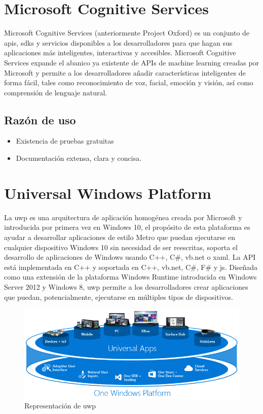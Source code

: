 \section{Microsoft Cognitive Services}

Microsoft Cognitive Services\cite{Oxford} (anteriormente Project Oxford) es un conjunto de \acrshort{api}s, \acrshort{sdk}s y servicios disponibles a los desarrolladores para que hagan sus aplicaciones más inteligentes, interactivas y accesibles. Microsoft Cognitive Services expande el abanico ya existente de APIs de machine learning creadas por Microsoft y permite a los desarrolladores añadir características inteligentes de forma fácil, tales como reconocimiento de voz, facial, emoción y visión, así como comprensión de lenguaje natural.

\subsection{Razón de uso}

\begin{itemize}
	\item Existencia de pruebas gratuitas
	\item Documentación extensa, clara y concisa.

\end{itemize}

\section{Universal Windows Platform}

La \acrfull{uwp}\cite{UWP} es una arquitectura de aplicación homogénea creada por Microsoft y introducida por primera vez en Windows 10, el propósito de esta plataforma es ayudar a desarrollar aplicaciones de estilo Metro que puedan ejecutarse en cualquier dispositivo Windows 10 sin necesidad de ser reescritas, soporta el desarrollo de aplicaciones de Windows usando C++, C\#, \acrshort{vb.net} o \acrshort{xaml}. La API está implementada en C++ y soportada en C++, \acrshort{vb.net}, C\#, F\# y \acrfull{js}. Diseñada como una extensión de la plataforma Windows Runtime introducida en Windows Server 2012 y Windows 8, \acrshort{uwp} permite a los desarrolladores crear aplicaciones que puedan, potencialmente, ejecutarse en múltiples tipos de dispositivos.

\begin{figure}[!htbp]
	\centering
	\includegraphics[scale=0.7]{fig/uwp_representation}
	\caption{Representación de \acrshort{uwp}}
\end{figure}

